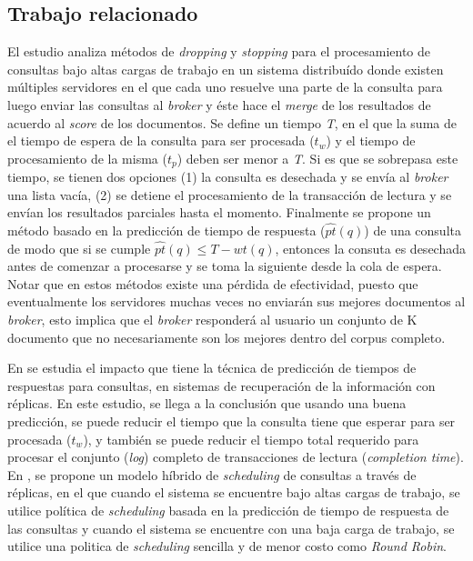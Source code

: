 \subsection{Trabajo relacionado}
\label{marco:tr}
El estudio \citep{Broccolo:2013} analiza métodos de \textit{dropping} y \textit{stopping} para el procesamiento de consultas bajo altas cargas de trabajo en un sistema distribuído donde existen múltiples servidores en el que cada uno resuelve una parte de la consulta para luego enviar las consultas al \textit{broker} y éste hace el \textit{merge} de los resultados de acuerdo al \textit{score} de los documentos. Se define un tiempo \textit{T}, en el que la suma de el tiempo de espera de la consulta para ser procesada ($t_{w}$) y el tiempo de procesamiento de la misma ($t_{p}$) deben ser menor a \textit{T}. Si es que se sobrepasa este tiempo, se tienen dos opciones (1) la consulta es desechada y se envía al \textit{broker} una lista vacía, (2) se detiene el procesamiento de la transacción de lectura y se envían los resultados parciales hasta el momento. Finalmente se propone un método basado en la predicción de tiempo de respuesta ($\hat{pt}(q)$) de una consulta \citep{Macdonald:2012} de modo que si se cumple $ \hat{pt}(q) \leq T - wt(q) $, entonces la consuta es desechada antes de comenzar a procesarse y se toma la siguiente desde la cola de espera. Notar que en estos métodos existe una pérdida de efectividad, puesto que eventualmente los servidores muchas veces no enviarán sus mejores documentos al \textit{broker}, esto implica que el \textit{broker} responderá al usuario un conjunto de K documento que no necesariamente son los mejores dentro del corpus completo.

En \citep{Freire:2012} se estudia el impacto que tiene la técnica de predicción de tiempos de respuestas para consultas, \citep{Tonellotto:2011} en sistemas de recuperación de la información con réplicas. En este estudio, se llega a la conclusión que usando una buena predicción, se puede reducir el tiempo que la consulta tiene que esperar para ser procesada ($t_{w}$), y también se puede reducir el tiempo total requerido para procesar el conjunto (\textit{log}) completo de transacciones de lectura (\textit{completion time}). En \citep{Freire:2013}, se propone un modelo híbrido de \textit{scheduling} de consultas a través de réplicas, en el que cuando el sistema se encuentre bajo altas cargas de trabajo, se utilice política de \textit{scheduling} basada en la predicción de tiempo de respuesta de las consultas \citep{Macdonald:2012} y cuando el sistema se encuentre con una baja carga de trabajo, se utilice una politica de \textit{scheduling} sencilla y de menor costo como \textit{Round Robin}.